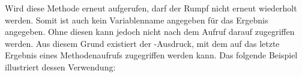 Wird diese Methode erneut aufgerufen, darf der Rumpf nicht erneut wiederholt werden.
Somit ist auch kein Variablenname angegeben für das Ergebnis angegeben.
Ohne diesen kann jedoch nicht nach dem Aufruf darauf zugegriffen werden.
Aus diesem Grund existiert der -Ausdruck, mit dem auf das letzte Ergebnis eines Methodenaufrufs zugegriffen werden kann.
Das folgende Beispiel illustriert dessen Verwendung:

\\

\\


